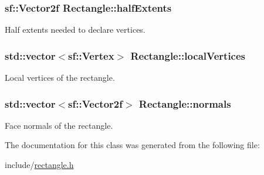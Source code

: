 \subsubsection[{\texorpdfstring{half\+Extents}{halfExtents}}]{\setlength{\rightskip}{0pt plus 5cm}sf\+::\+Vector2f Rectangle\+::half\+Extents\hspace{0.3cm}{\ttfamily [protected]}}\hypertarget{class_rectangle_aa51d214692884af3c403655d08d48076}{}\label{class_rectangle_aa51d214692884af3c403655d08d48076}
Half extents needed to declare vertices. 
\subsubsection[{\texorpdfstring{local\+Vertices}{localVertices}}]{\setlength{\rightskip}{0pt plus 5cm}std\+::vector$<$sf\+::\+Vertex$>$ Rectangle\+::local\+Vertices\hspace{0.3cm}{\ttfamily [protected]}}\hypertarget{class_rectangle_a827fd01362a28eca0b1bb3f89c559d36}{}\label{class_rectangle_a827fd01362a28eca0b1bb3f89c559d36}
Local vertices of the rectangle. 
\subsubsection[{\texorpdfstring{normals}{normals}}]{\setlength{\rightskip}{0pt plus 5cm}std\+::vector$<$sf\+::\+Vector2f$>$ Rectangle\+::normals\hspace{0.3cm}{\ttfamily [protected]}}\hypertarget{class_rectangle_ac94537e97b66a5d92a1919c99543c598}{}\label{class_rectangle_ac94537e97b66a5d92a1919c99543c598}
Face normals of the rectangle. 

The documentation for this class was generated from the following file\+:\begin{DoxyCompactItemize}
\item 
include/\hyperlink{rectangle_8h}{rectangle.\+h}\end{DoxyCompactItemize}

